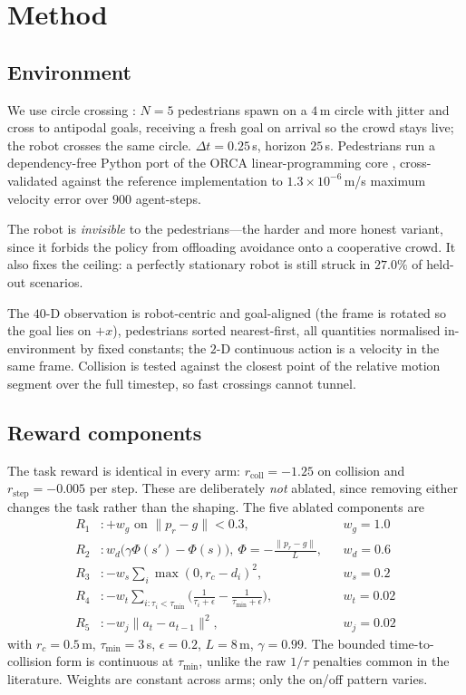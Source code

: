 \documentclass[conference]{IEEEtran}
\begin{document}
\section{Method}
\subsection{Environment}
We use circle crossing \cite{chen2019crowdrobot}: $N=5$ pedestrians spawn on a
$4$\,m circle with jitter and cross to antipodal goals, receiving a fresh goal on
arrival so the crowd stays live; the robot crosses the same circle.
$\Delta t=0.25$\,s, horizon $25$\,s. Pedestrians run a dependency-free Python
port of the ORCA linear-programming core \cite{vandenberg2011reciprocal},
cross-validated against the reference implementation to $1.3\times10^{-6}$\,m/s
maximum velocity error over $900$ agent-steps.

The robot is \emph{invisible} to the pedestrians---the harder and more honest
variant, since it forbids the policy from offloading avoidance onto a cooperative
crowd. It also fixes the ceiling: a perfectly stationary robot is still struck in
$27.0\%$ of held-out scenarios.

The $40$-D observation is robot-centric and goal-aligned (the frame is rotated so
the goal lies on $+x$), pedestrians sorted nearest-first, all quantities
normalised in-environment by fixed constants; the $2$-D continuous action is a
velocity in the same frame. Collision is tested against the closest point of the
relative motion segment over the full timestep, so fast crossings cannot tunnel.

\subsection{Reward components}
The task reward is identical in every arm: $r_{\text{coll}}=-1.25$ on collision
and $r_{\text{step}}=-0.005$ per step. These are deliberately \emph{not} ablated,
since removing either changes the task rather than the shaping. The five ablated
components are
\begin{align}
R_1 &: +w_g \text{ on } \lVert p_r-g\rVert<0.3, && w_g=1.0 \nonumber\\
R_2 &: w_d\big(\gamma\Phi(s')-\Phi(s)\big),\ \Phi=-\tfrac{\lVert p_r-g\rVert}{L},
   && w_d=0.6 \nonumber\\
R_3 &: -w_s\textstyle\sum_i\max(0,r_c-d_i)^2, && w_s=0.2 \nonumber\\
R_4 &: -w_t\!\!\sum_{i:\tau_i<\tau_{\min}}\!\!
   \Big(\tfrac{1}{\tau_i+\epsilon}-\tfrac{1}{\tau_{\min}+\epsilon}\Big),
   && w_t=0.02 \nonumber\\
R_5 &: -w_j\lVert a_t-a_{t-1}\rVert^2, && w_j=0.02 \nonumber
\end{align}
with $r_c=0.5$\,m, $\tau_{\min}=3$\,s, $\epsilon=0.2$, $L=8$\,m, $\gamma=0.99$.
The bounded time-to-collision form is continuous at $\tau_{\min}$, unlike the raw
$1/\tau$ penalties common in the literature. Weights are constant across arms;
only the on/off pattern varies.
\end{document}

